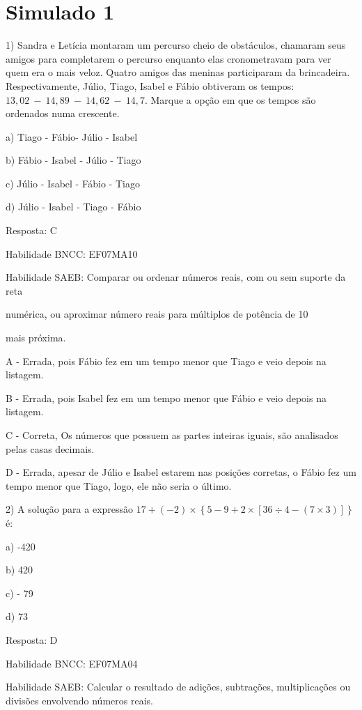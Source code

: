 \hypertarget{simulado-1}{%
\section{Simulado 1}\label{simulado-1}}

1) Sandra e Letícia montaram um percurso cheio de obstáculos, chamaram
seus amigos para completarem o percurso enquanto elas cronometravam para
ver quem era o mais veloz. Quatro amigos das meninas participaram da
brincadeira. Respectivamente, Júlio, Tiago, Isabel e Fábio obtiveram os
tempos: \(13,02\  - \ 14,89\  - \ 14,62\  - \ 14,7\). Marque a opção em
que os tempos são ordenados numa crescente.~

a) Tiago - Fábio- Júlio - Isabel

b) Fábio - Isabel - Júlio - Tiago

c) Júlio - Isabel - Fábio - Tiago

d) Júlio - Isabel - Tiago - Fábio

Resposta: C

Habilidade BNCC: EF07MA10

Habilidade SAEB: Comparar ou ordenar números reais, com ou sem suporte
da reta

numérica, ou aproximar número reais para múltiplos de potência de 10

mais próxima.

A - Errada, pois Fábio fez em um tempo menor que Tiago e veio depois na
listagem.

B - Errada, pois Isabel fez em um tempo menor que Fábio e veio depois na
listagem.

C - Correta, Os números que possuem as partes inteiras iguais, são
analisados pelas casas decimais.

D - Errada, apesar de Júlio e Isabel estarem nas posições corretas, o
Fábio fez um tempo menor que Tiago, logo, ele não seria o último.

2) A solução para a expressão
\(17 + ( - 2) \times \left\{ 5 - 9 + 2 \times \left\lbrack 36 \div 4 - \left( 7 \times 3 \right) \right\rbrack \right\}\)
é:

a) -420

b) 420

c) - 79

d) 73

Resposta: D

Habilidade BNCC: EF07MA04

Habilidade SAEB: Calcular o resultado de adições, subtrações,
multiplicações ou divisões envolvendo números reais.


